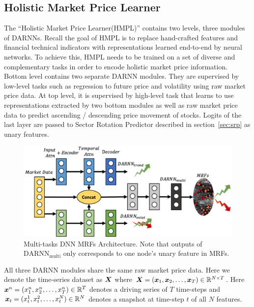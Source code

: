 \documentclass[sigconf,anonymous,review]{acmart}
\renewcommand{\cite}{\citep}
\begin{document}
\subsection{Holistic Market Price Learner}
\label{sec:hmpl}

The ``Holistic Market Price Learner(HMPL)'' contains two levels,
three modules of DARNNs\cite{qin2017dual}. Recall the goal of
HMPL is to replace hand-crafted features and financial technical
indicators with representations learned end-to-end by neural
networks. To achieve this, HMPL needs to be trained on a set of
diverse and complementary tasks in order to encode holistic
market price information. Bottom level contains two separate
DARNN modules. They are supervised by low-level tasks such as
regression to future price and volatility using raw market price
data. At top level, it is supervised by high-level task that
learns to use representations extracted by two bottom modules as
well as raw market price data to predict ascending / descending
price movement of stocks. Logits of the last layer are passed to
Sector Rotation Predictor described in section~\ref{sec:srp} as
unary features.

\begin{figure}[t]
  \centering
  \includegraphics[width=1\columnwidth]{Methodology/figures/hmplmrf.png}
  \caption{\label{fig:mrfrnn} Multi-tasks DNN MRFs Architecture. Note 
  that outputs of $\text{DARNN}_{\text{multi}}$ only corresponds to one 
  node's unary feature in MRFs.}
\end{figure}

All three DARNN modules share the same raw market price data.
Here we denote the time-series dataset as ${\boldsymbol{X}}$ where
${\boldsymbol{X}}=({\boldsymbol{x}}_1,{\boldsymbol{x}}_2,\dots,{\boldsymbol{x}}_T)\in \mathbb{R}^{N\times T}$. Here
${\boldsymbol{x}}^n=(x_1^n,x_2^n,\dots,x_T^n) \in \mathbb{R}^T$ denotes a driving
series of $T$ time-steps and ${\boldsymbol{x}}_t=(x_t^1,x_t^2\\ ,\dots
,x_t^N)\in \mathbb{R}^N$ denotes a snapshot at time-step $t$ of all
$N$ features.
\end{document}
